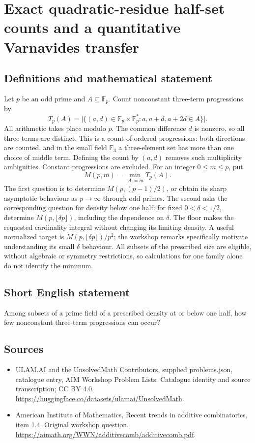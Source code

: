 \documentclass[11pt,a4paper]{article}
\begin{document}
\section*{Exact quadratic-residue half-set counts and a quantitative Varnavides transfer}\label{statement}

\subsection{Definitions and mathematical statement}
Let $p$ be an odd prime and $A\subseteq\mathbb F_p$. Count nonconstant
three-term progressions by
\[
 T_p(A)=\bigl|\{(a,d)\in\mathbb F_p\times\mathbb F_p^*:
                              a,a+d,a+2d\in A\}\bigr|.
\]
All arithmetic takes place modulo $p$. The common difference $d$
is nonzero, so all three terms are distinct. This is a count of
ordered progressions: both directions are counted, and in the small
field $\mathbb F_3$ a three-element set has more than one choice of
middle term. Defining the count by $(a,d)$ removes such multiplicity
ambiguities. Constant progressions are excluded.
For an integer $0\le m\le p$, put
\[
                         M(p,m)=\min_{|A|=m}T_p(A).
\]
The first question is to determine $M(p,(p-1)/2)$, or obtain its
sharp asymptotic behaviour as $p\to\infty$ through odd primes.
The second asks the corresponding question for density below one
half: for fixed $0<\delta<1/2$, determine
$M(p,\lfloor\delta p\rfloor)$, including the dependence on $\delta$.
The floor makes the requested cardinality integral without changing
its limiting density.
A useful normalized target is $M(p,\lfloor\delta p\rfloor)/p^2$;
the workshop remarks specifically motivate understanding its small
$\delta$ behaviour. All subsets of the prescribed size are eligible,
without algebraic or symmetry restrictions, so calculations for one
family alone do not identify the minimum.
\subsection{Short English statement}
Among subsets of a prime field of a prescribed density at or below one half, how few nonconstant three-term progressions can occur?
\subsection{Sources}
\begin{itemize}
\item[S1] ULAM.AI and the UnsolvedMath Contributors, supplied problems.json, catalogue entry, AIM Workshop Problem Lists. Catalogue identity and source transcription; CC BY 4.0.
\url{https://huggingface.co/datasets/ulamai/UnsolvedMath}.
\item[S2] American Institute of Mathematics, Recent trends in additive combinatorics, item 1.4. Original workshop question.
\url{https://aimath.org/WWN/additivecomb/additivecomb.pdf}.
\end{itemize}
\end{document}

